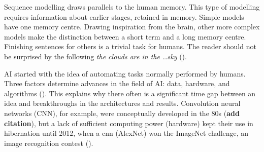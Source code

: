 Sequence modelling draws parallels to the human memory. This type of modelling requires information about earlier stages, retained in memory. Simple models have one memory centre. Drawing inspiration from the brain, other more complex models make the distinction between a short term and a long memory centre. Finishing sentences for others is a trivial task for humans. The reader should not be surprised by the following \textit{the clouds are in the \ldots sky} (\cite{colah_blog_post}).

AI started with the idea of automating tasks normally performed by humans. Three factors determine advances in the field of AI: data, hardware, and algorithms (\cite{chollet_book}). This explains why there often is a significant time gap between an idea and breakthroughs in the architectures and results. Convolution neural networks (CNN), for example, were conceptually developed in the 80s (\textbf{add citation}), but a lack of sufficient computing power (hardware) kept their use in hibernation until 2012, when a \acrshort{cnn} (AlexNet) won the ImageNet challenge, an image recognition contest (\cite{AlexNet}).

